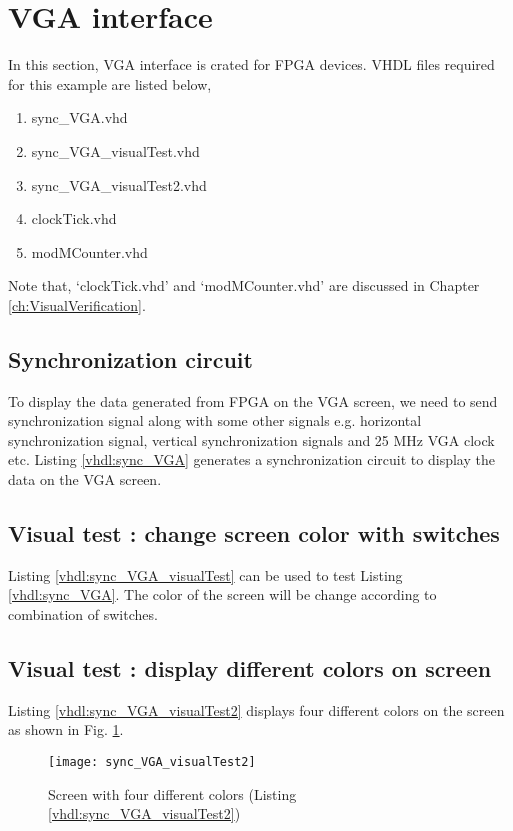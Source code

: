 

\section{VGA interface}
In this section, VGA interface is crated for FPGA devices. VHDL files required for this example are listed below, 
\begin{enumerate}
	\item sync\_VGA.vhd
	\item sync\_VGA\_visualTest.vhd
	\item sync\_VGA\_visualTest2.vhd
	\item clockTick.vhd
	\item modMCounter.vhd
\end{enumerate}
Note that, `clockTick.vhd' and `modMCounter.vhd' are discussed in Chapter \ref{ch:VisualVerification}.

\subsection{Synchronization circuit}
To display the data generated from FPGA on the VGA screen, we need to send synchronization signal along with some other signals e.g. horizontal synchronization signal, vertical synchronization signals and 25 MHz VGA clock etc. Listing \ref{vhdl:sync_VGA} generates a synchronization circuit to display the data on the VGA screen.   


\subsection{Visual test : change screen color with switches}
Listing \ref{vhdl:sync_VGA_visualTest} can be used to test Listing \ref{vhdl:sync_VGA}. The color of the screen will be change according to combination of switches. 



\subsection{Visual test : display different colors on screen}
Listing \ref{vhdl:sync_VGA_visualTest2} displays four different colors on the screen as shown in Fig. \ref{fig:sync_VGA_visualTest2}. 

\begin{figure}[!h]
	\centering
	\texttt{[image: sync\_VGA\_visualTest2]}
	\caption{Screen with four different colors (Listing \ref{vhdl:sync_VGA_visualTest2})}
	\label{fig:sync_VGA_visualTest2}
\end{figure}



